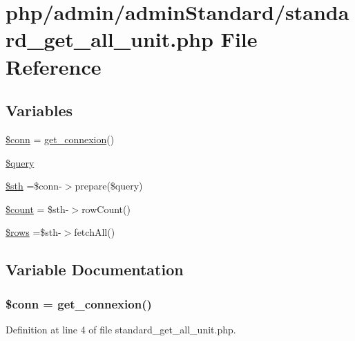 \hypertarget{standard__get__all__unit_8php}{\section{php/admin/admin\-Standard/standard\-\_\-get\-\_\-all\-\_\-unit.php File Reference}
\label{standard__get__all__unit_8php}
}
\subsection*{Variables}
\begin{DoxyCompactItemize}
\item 
\hyperlink{standard__get__all__unit_8php_aa8a5a87b9c1a6a0819b88447cbe41877}{\$conn} = \hyperlink{php__functions_8php_ace18bc10f3fd08f92688ac743e0d8c2e}{get\-\_\-connexion}()
\item 
\hyperlink{standard__get__all__unit_8php_af59a5f7cd609e592c41dc3643efd3c98}{\$query}
\item 
\hyperlink{standard__get__all__unit_8php_afa9126f9664959c02795be300a135f93}{\$sth} =\$conn-\/$>$prepare(\$query)
\item 
\hyperlink{standard__get__all__unit_8php_af789423037bbc89dc7c850e761177570}{\$count} = \$sth-\/$>$row\-Count()
\item 
\hyperlink{standard__get__all__unit_8php_ace2ec39e7df3899fa8df9640ec274b03}{\$rows} =\$sth-\/$>$fetch\-All()
\end{DoxyCompactItemize}


\subsection{Variable Documentation}
\hypertarget{standard__get__all__unit_8php_aa8a5a87b9c1a6a0819b88447cbe41877}{
\subsubsection[{\$conn}]{\setlength{\rightskip}{0pt plus 5cm}\$conn = {\bf get\-\_\-connexion}()}}\label{standard__get__all__unit_8php_aa8a5a87b9c1a6a0819b88447cbe41877}


Definition at line 4 of file standard\-\_\-get\-\_\-all\-\_\-unit.\-php.

